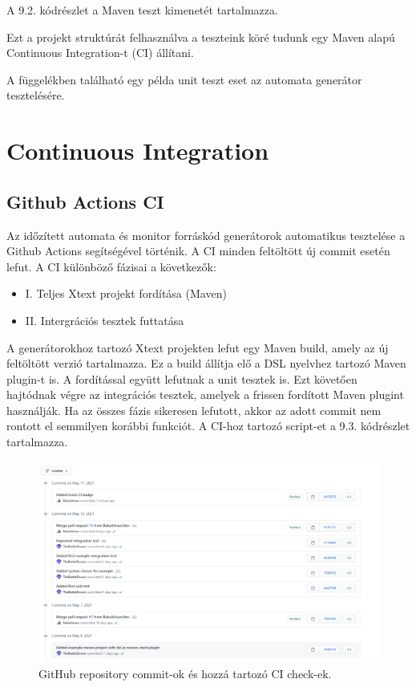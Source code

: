 A 9.2. kódrészlet a Maven teszt kimenetét tartalmazza.

Ezt a projekt struktúrát felhasználva a teszteink köré tudunk egy Maven alapú Continuous Integration-t (CI) állítani.

A függelékben található egy példa unit teszt eset az automata generátor tesztelésére.

\clearpage\section{Continuous Integration}\subsection{Github Actions CI}

Az időzített automata és monitor forráskód generátorok automatikus tesztelése a Github Actions segítségével történik.
A CI minden feltöltött új commit esetén lefut.
A CI különböző fázisai a következők:

\begin{itemize}
    \item I. Teljes Xtext projekt fordítása (Maven)
    \item II. Intergrációs tesztek futtatása
\end{itemize}

A generátorokhoz tartozó Xtext projekten lefut egy Maven build, amely az új feltöltött verzió tartalmazza.
Ez a build állítja elő a DSL nyelvhez tartozó Maven plugin-t is.
A fordítással együtt lefutnak a unit tesztek is.
Ezt követően hajtódnak végre az integrációs tesztek, amelyek a frissen fordított Maven plugint használják.
Ha az összes fázis sikeresen lefutott, akkor az adott commit nem rontott el semmilyen korábbi funkciót.
A CI-hoz tartozó script-et a 9.3. kódrészlet tartalmazza.

\begin{figure}[!ht]
    \centering
    \includegraphics[width=150mm, keepaspectratio]{figures/github_ci_check.png}
    \caption{GitHub repository commit-ok és hozzá tartozó CI check-ek.}
\end{figure}


